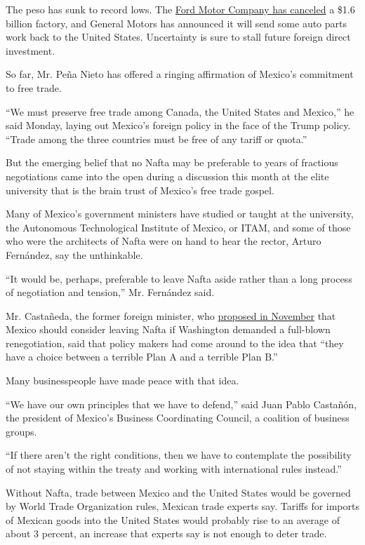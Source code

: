 The peso has sunk to record lows. The
\href{https://www.nytimes3xbfgragh.onion/2017/01/03/business/ford-general-motors-trump.html}{Ford
Motor Company has canceled} a \$1.6 billion factory, and General Motors
has announced it will send some auto parts work back to the United
States. Uncertainty is sure to stall future foreign direct investment.

So far, Mr. Peña Nieto has offered a ringing affirmation of Mexico's
commitment to free trade.

``We must preserve free trade among Canada, the United States and
Mexico,'' he said Monday, laying out Mexico's foreign policy in the face
of the Trump policy. ``Trade among the three countries must be free of
any tariff or quota.''

But the emerging belief that no Nafta may be preferable to years of
fractious negotiations came into the open during a discussion this month
at the elite university that is the brain trust of Mexico's free trade
gospel.

Many of Mexico's government ministers have studied or taught at the
university, the Autonomous Technological Institute of Mexico, or ITAM,
and some of those who were the architects of Nafta were on hand to hear
the rector, Arturo Fernández, say the unthinkable.

``It would be, perhaps, preferable to leave Nafta aside rather than a
long process of negotiation and tension,'' Mr. Fernández said.

Mr. Castañeda, the former foreign minister, who
\href{https://www.nytimes3xbfgragh.onion/2016/11/22/opinion/mexico-can-stand-up-to-trump.html}{proposed
in November} that Mexico should consider leaving Nafta if Washington
demanded a full-blown renegotiation, said that policy makers had come
around to the idea that ``they have a choice between a terrible Plan A
and a terrible Plan B.''

Many businesspeople have made peace with that idea.

``We have our own principles that we have to defend,'' said Juan Pablo
Castañón, the president of Mexico's Business Coordinating Council, a
coalition of business groups.

``If there aren't the right conditions, then we have to contemplate the
possibility of not staying within the treaty and working with
international rules instead.''

Without Nafta, trade between Mexico and the United States would be
governed by World Trade Organization rules, Mexican trade experts say.
Tariffs for imports of Mexican goods into the United States would
probably rise to an average of about 3 percent, an increase that experts
say is not enough to deter trade.

